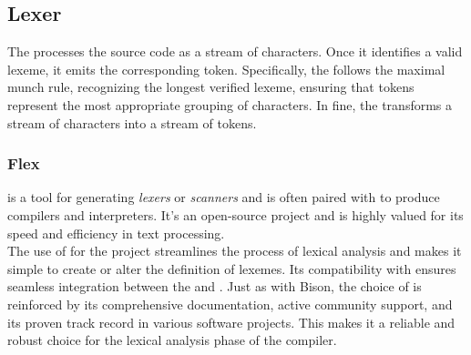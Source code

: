 \subsection{Lexer}

The \lexer{} processes the source code as a stream of characters. Once it identifies
a valid lexeme, it emits the corresponding token. Specifically, the \lexer{} follows
the maximal munch rule, recognizing the longest verified lexeme, ensuring that tokens
represent the most appropriate grouping of characters. In fine, the \lexer{}
transforms a stream of characters into a stream of tokens.



\vspace*{-.5cm}
\subsubsection{Flex}

\lexerGen{} is a tool for generating \textit{lexers} or \textit{scanners} and is
often paired with \parserGen{} to produce compilers and interpreters. It's an
open-source project and is highly valued for its speed and efficiency in text
processing. \\

The use of \lexerGen{} for the \lang{} project streamlines the process of lexical
analysis and makes it simple to create or alter the definition of lexemes. Its
compatibility with \parserGen{} ensures seamless integration between the \lexer{} and
\parser{}. Just as with Bison, the choice of \lexerGen{} is reinforced by its
comprehensive documentation, active community support, and its proven track record in
various software projects. This makes it a reliable and robust choice for the lexical
analysis phase of the \lang{} compiler.

